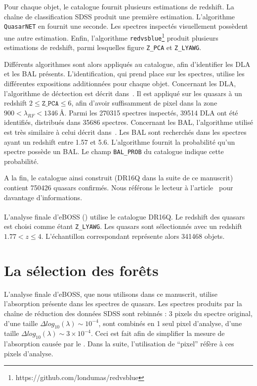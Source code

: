 \documentclass[11pt, twoside, a4paper, openright]{report}
\begin{document}
Pour chaque objet, le catalogue fournit plusieurs estimations de redshift. La chaîne de classification SDSS produit une première estimation. L'algorithme \texttt{QuasarNET} en fournit une seconde. Les spectres inspectés visuellement possèdent une autre estimation. Enfin, l'algorithme \texttt{redvsblue}\footnote{https://github.com/londumas/redvsblue} produit plusieurs estimations de redshift, parmi lesquelles figure \texttt{Z\_PCA} et \texttt{Z\_LYAWG}.

Différents algorithmes sont alors appliqués au catalogue, afin d'identifier les DLA et les BAL présents. L'identification, qui prend place sur les spectres, utilise les différentes expositions additionnées pour chaque objet.
Concernant les DLA, l'algorithme de déctection est décrit dans~\cite{Parks2017}. Il est appliqué sur les quasars à un redshift $2 \leq \texttt{Z\_PCA} \leq 6$, afin d'avoir suffisamment de pixel dans la zone $900 < \lambda_{RF} < \SI{1346}{\angstrom}$. Parmi les \num{270315} spectres inspectés, \num{39514} DLA ont été identifiés, distribués dans \num{35686} spectres.
Concernant les BAL, l'algorithme utilisé est très similaire à celui décrit dans~\cite{Guo2019}. Les BAL sont recherchés dans les spectres ayant un redshift entre \num{1.57} et \num{5.6}. L'algorithme fournit la probabilité qu'un spectre possède un BAL. Le champ \texttt{BAL\_PROB} du catalogue indique cette probabilité.

A la fin, le catalogue ainsi construit (DR16Q dans la suite de ce manuscrit) contient \num{750426} quasars confirmés. Nous référons le lecteur à l'article~\cite{CITE:Lyke in prep} pour davantage d'informations.



\paragraph{}
L'analyse \lya{} finale d'eBOSS (\cite{CITE:dr16}) utilise le catalogue DR16Q. Le redshift des quasars est choisi comme étant \texttt{Z\_LYAWG}. Les quasars sont sélectionnés avec un redshift $1.77 < z \leq 4$. L'échantillon correspondant représente alors \num{341468} objets.


\section{La sélection des forêts}
L'analyse \lya{} finale d'eBOSS, que nous utilisons dans ce manuscrit, utilise l'absorption \lya{} présente dans les spectres de quasars. Les spectres produits par la chaîne de réduction des données SDSS sont rebinnés : 3 pixels du spectre original, d'une taille $\Delta log_{10}(\lambda) \sim 10^{-4}$, sont combinés en 1 seul pixel d'analyse, d'une taille $\Delta log_{10}(\lambda) \sim 3 \times 10^{-4}$. Ceci est fait afin de simplifier la mesure de l'absorption causée par le \lya{}. Dans la suite, l'utilisation de ``pixel'' réfère à ces pixels d'analyse.
\end{document}

